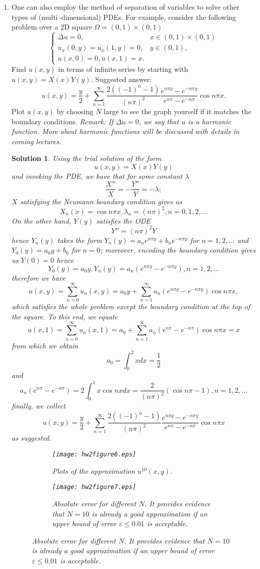 \documentclass[6pt]{article}
\newtheorem{solution}{Solution}
\numberwithin{equation}{section}
\begin{document}
\begin{enumerate}
\item One can also employ the method of separation of variables to solve other types of (multi--dimensional) PDEs.  For example, consider the following problem over a 2D square $\Omega=(0,1)\times(0,1)$
\begin{equation}
\left\{
\begin{array}{ll}
\Delta u=0,& x\in(0,1)\times(0,1)\\
u_x(0,y)=u_x(1,y)=0,&y\in(0,1),\\
u(x,0)=0, u(x,1)=x. &
\end{array}
\right.
\end{equation}
Find $u(x,y)$ in terms of infinite series by starting with $u(x,y)=X(x)Y(y)$.  Suggested answer:
\[u(x,y)=\frac{y}{2}+\sum_{n=1}^\infty \frac{2((-1)^n-1)}{(n\pi)^2}\frac{e^{n\pi y}-e^{-n\pi y}}{e^{n\pi}-e^{-n\pi}}\cos n\pi x.\]
Plot $u(x,y)$ by choosing $N$ large to see the graph yourself if it matches the boundary conditions.  \emph{Remark: If $\Delta u=0$, we say that $u$ is a harmonic function.  More about harmonic functions will be discussed with details in coming lectures.}
\begin{solution}
Using the trial solution of the form \[u(x,y)=X(x)Y(y)\]
and invoking the PDE, we have that for some constant $\lambda$
\[\frac{X''}{X}=-\frac{Y''}{Y}=-\lambda;\]
$X$ satisfying the Neumann boundary condition gives us
\[X_n(x)=\cos n \pi x, \lambda_n=(n\pi)^2,n=0,1,2,...\]
On the other hand, $Y(y)$ satisfies the ODE
\[Y''=(n\pi)^2Y\]
hence $Y_n(y)$ takes the form $Y_n(y)=a_ne^{n\pi y}+b_ne^{-n\pi y}$ for $n=1,2,...$ and $Y_0(y)=a_0y+b_0$ for $n=0$; moreover, encoding the boundary condition gives us $Y(0)=0$ hence
\[Y_0(y)=a_0y, Y_n(y)=a_n(e^{n\pi y}-e^{-n\pi y}), n=1,2,...\]
therefore we have
\[u(x,y)=\sum_{n=0}^\infty u_n(x,y)=a_0y+\sum_{n=1}^\infty a_n(e^{n\pi y}-e^{-n\pi y})\cos n\pi x,\]
which satisfies the whole problem except the boundary condition at the top of the square.  To this end, we equate
\[u(x,1)=\sum_{n=0}^\infty u_n(x,1)=a_0+\sum_{n=1}^\infty a_n(e^{n\pi }-e^{-n\pi })\cos n\pi x=x\]
from which we obtain
\[a_0=\int_0^2 xdx=\frac{1}{2}\]
and
\[a_n(e^{n\pi }-e^{-n\pi })=2\int_0^1 x\cos nx dx=\frac{2}{(n\pi)^2}(\cos n \pi-1),n=1,2,...\]
finally, we collect
\[u(x,y)=\frac{y}{2}+\sum_{n=1}^\infty \frac{2((-1)^n-1)}{(n\pi)^2}\frac{e^{n\pi y}-e^{-n\pi y}}{e^{n\pi}-e^{-n\pi}}\cos n\pi x\]
as suggested.
\begin{figure}
    \centering
    \begin{subfigure}[b]{0.48\textwidth}
        \texttt{[image: hw2figure6.eps]}
        \caption{Plots of the approximation $u^{10}(x,y)$.}
    \end{subfigure}
    \begin{subfigure}[b]{0.48\textwidth}
        \texttt{[image: hw2figure7.eps]}
        \caption{Absolute error for different $N$.  It provides evidence that $N=10$ is already a good approximation if an upper bound of error $\varepsilon\leq 0.01$ is acceptable.}
    \end{subfigure}
\label{figure5}
\end{figure}
\end{solution}


\end{enumerate}
\end{document}
